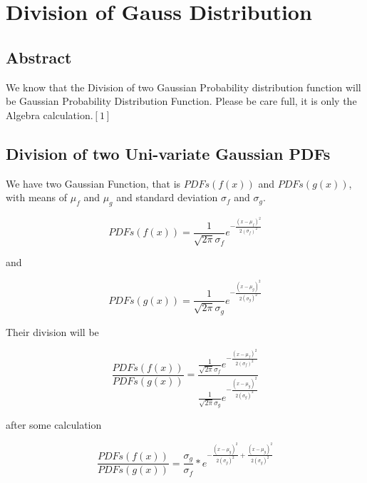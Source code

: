 
\chapter{Division of Gauss Distribution } %

\label{chapter 2} %




\section{Abstract}

We know that the Division of two Gaussian Probability distribution function will be Gaussian Probability Distribution Function. Please be care full, it is only the Algebra calculation.$[1]$





\section{Division of two Uni-variate Gaussian PDFs}

We have two Gaussian Function, that is $PDFs(f(x))$ and $PDFs(g(x))$, with means of $\mu_f$ and $\mu_g$ and standard deviation $\sigma_f$ and $\sigma_g$.

$$PDFs(f(x)) = \frac{1}{\sqrt{2\pi}\sigma_f}{e^{-\frac{{(x-\mu _f)}^2}{2{(\sigma_f)}^2}}}$$

and 

$$PDFs(g(x)) = \frac{1}{\sqrt{2\pi}\sigma_g}{e^{-\frac{{(x-\mu _g)}^2}{2{(\sigma_g)}^2}}}$$

 Their division will be 
 
 \begin{equation}
     \frac{PDFs(f(x))}{PDFs(g(x))} = \frac{\frac{1}{\sqrt{2\pi}\sigma_f}{e^{-\frac{{(x-\mu _f)}^2}{2{(\sigma_f)}^2}}}}{\frac{1}{\sqrt{2\pi}\sigma_g}{e^{-\frac{{(x-\mu _g)}^2}{2{(\sigma_g)}^2}}}}
\end{equation}

after some calculation

\begin{equation}
     \frac{PDFs(f(x))}{PDFs(g(x))} = \frac{\sigma_g}{\sigma_f} *  {e^{-\frac{{(x-\mu _g)}^2}{2{(\sigma_g)}^2} + {\frac{{(x-\mu _g)}^2}{2{(\sigma_g)}^2}}}}
\end{equation}
     
